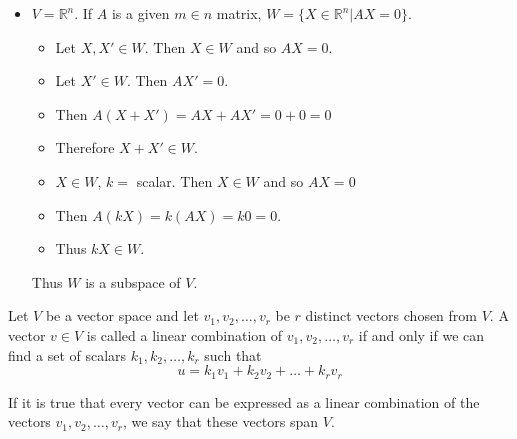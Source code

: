\documentclass[12pt]{article}
\begin{document}
\begin{example}
\begin{itemize}
\item $V = \mathbb{R}^n$. If $A$ is a given $m \in n$ matrix, $W = \{ X \in \mathbb{R}^n | AX = 0\} $. \begin{itemize} \item Let $X, X' \in W$. Then $X \in W$ and so $AX = 0$. \item Let $X' \in W$. Then $AX' = 0$. \item Then $A(X + X') = AX + AX' = 0 + 0 = 0$ \item Therefore $X + X' \in W$. \item $X \in W$, $k = $ scalar. Then $X \in W$ and so $AX = 0$ \item Then $A(kX) = k(AX) = k0 = 0$. \item Thus $kX \in W$. \end{itemize} Thus $W$ is a subspace of $V$. \end{itemize} \end{example}
\begin{definition} Let $V$ be a vector space and let $v_1, v_2, \dots, v_r$ be $r$ distinct vectors chosen from $V$. A vector $v \in V$ is called a linear combination of $v_1, v_2, \dots, v_r$ if and only if we can find a set of scalars $k_1, k_2, \dots, k_r$ such that $$ u = k_1v_1 + k_2v_2 + \dots + k_rv_r $$ \end{definition} \begin{definition} If it is true that every vector can be expressed as a linear combination of the vectors $v_1, v_2, \dots, v_r$, we say that these vectors span $V$. \end{definition} 
\end{document}
